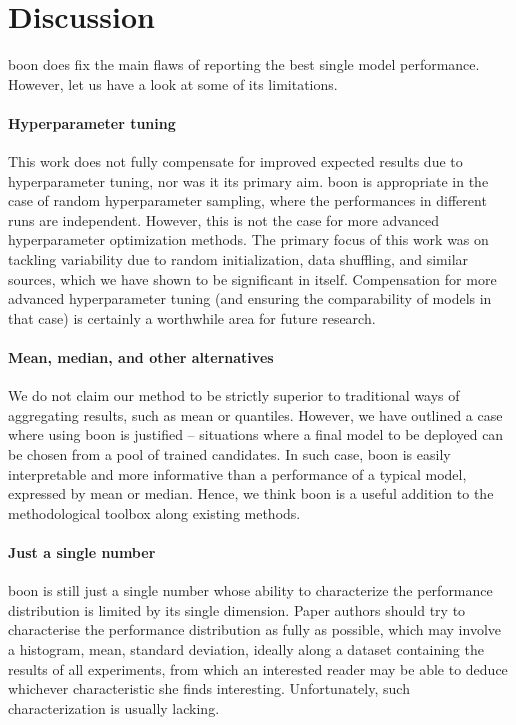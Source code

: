 \documentclass{article}
\newcommand{\asr}{\gls{psr}\xspace}
\newcommand{\boo}[1]{\text{Boo}_{#1}}
\newcommand{\tboon}{\gls{boon}\xspace}
\newcommand{\Em}[1]{\boo{#1}}
\newcommand{\emn}{\Em{n}}
\begin{document}
  


\section{Discussion}
\tboon does fix the main flaws of reporting the best single model performance. However, let us have a look at some of its limitations.

\paragraph{Hyperparameter tuning} This work does not fully compensate for improved expected results due to hyperparameter tuning, nor was it its primary aim. \tboon is appropriate in the case of random hyperparameter sampling, where the performances in different runs are independent. However, this is not the case for more advanced hyperparameter optimization methods. The primary focus of this work was on tackling variability due to random initialization, data shuffling, and similar sources, which we have shown to be significant in itself. Compensation for more advanced hyperparameter tuning (and ensuring the comparability of models in that case) is certainly a worthwhile area for future research. 

\paragraph{Mean, median, and other alternatives} We do not claim our method to be strictly superior to traditional ways of aggregating results, such as mean or quantiles. However, we have outlined a case where using \tboon is justified -- situations where a final model to be deployed can be chosen from a pool of trained candidates. In such case, \tboon is easily interpretable and more informative than a performance of a typical model, expressed by mean or median. Hence, we think \tboon is a useful addition to the methodological toolbox along existing methods.


\paragraph{Just a single number} \tboon is still just a single number whose ability to characterize the performance distribution is limited by its single dimension. Paper authors should try to characterise the performance distribution as fully as possible, which may involve a histogram, mean, standard deviation, ideally along a dataset containing the results of all experiments, from which an interested reader may be able to deduce whichever characteristic she finds interesting. Unfortunately, such characterization is usually lacking.
\end{document}

